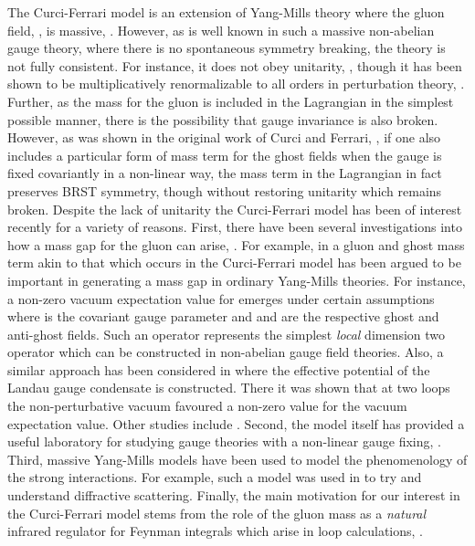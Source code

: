\documentclass[a4paper,11pt]{article}
\providecommand{\half}{\mbox{\small{\myHighlight{$\frac{1}{2}$}\coordHE{}}}}
\begin{document}
\newpage 
The Curci-Ferrari model is an extension of Yang-Mills theory where the gluon
field, \coordHE{}, is massive, \cite{1,2}. However, as is well known in such a
massive non-abelian gauge theory, where there is no spontaneous symmetry 
breaking, the theory is not fully consistent. For instance, it does not obey
unitarity, \cite{2,3,4}, though it has been shown to be multiplicatively
renormalizable to all orders in perturbation theory, \cite{1,4,5,6}. Further, 
as the mass for the gluon is included in the Lagrangian in the simplest 
possible manner, there is the possibility that gauge invariance is also broken.
However, as was shown in the original work of Curci and Ferrari, \cite{1,2}, if
one also includes a particular form of mass term for the ghost fields when the 
gauge is fixed covariantly in a non-linear way, the mass term in the Lagrangian
in fact preserves BRST symmetry, though without restoring unitarity which 
remains broken. Despite the lack of unitarity the Curci-Ferrari model has been 
of interest recently for a variety of reasons. First, there have been several
investigations into how a mass gap for the gluon can arise, \cite{7,8,9}. For 
example, in \cite{8,9} a gluon and ghost mass term akin to that which occurs in
the Curci-Ferrari model has been argued to be important in generating a mass 
gap in ordinary Yang-Mills theories. For instance, a non-zero vacuum 
expectation value for \myHighlight{$\langle \half (A_\mu^a)^2 ~+~ \alpha \bar{c}^a c^a
\rangle$}\coordHE{} emerges under certain assumptions where \myHighlight{$\alpha$}\coordHE{} is the covariant
gauge parameter and \coordHE{} and \coordHE{} are the respective ghost and 
anti-ghost fields. Such an operator represents the simplest {\em local}
dimension two operator which can be constructed in non-abelian gauge field 
theories. Also, a similar approach has been considered in \cite{7} where the 
effective potential of the Landau gauge condensate is constructed. There it was 
shown that at two loops the non-perturbative vacuum favoured a non-zero value 
for the vacuum expectation value. Other studies include \cite{10}. Second, the 
model itself has provided a useful laboratory for studying gauge theories with 
a non-linear gauge fixing, \cite{5,11}. Third, massive Yang-Mills models have 
been used to model the phenomenology of the strong interactions. For example, 
such a model was used in \cite{12} to try and understand diffractive 
scattering. Finally, the main motivation for our interest in the Curci-Ferrari 
model stems from the role of the gluon mass as a {\em natural} infrared 
regulator for Feynman integrals which arise in loop calculations, 
\cite{13,6,14}. 
\end{document}
